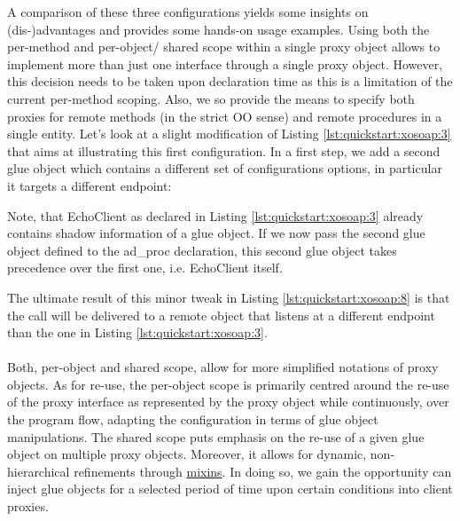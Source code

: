 A comparison of these three configurations yields some insights on (dis-)advantages and provides some  hands-on usage examples. Using both the per-method and per-object/ shared scope within a single proxy object allows to implement more than just one interface through a single proxy object. However, this decision needs to be taken upon declaration time as this is a limitation of the current per-method scoping. Also, we so provide the means to specify both proxies for remote methods (in the strict OO sense) and remote procedures in a single entity. Let's look at a slight modification of Listing \ref{lst:quickstart:xosoap:3} that aims at illustrating this first configuration. In a first step, we add a second glue object which contains a different set of configurations options, in particular it targets a different endpoint:
%

%
Note, that EchoClient as declared in Listing \ref{lst:quickstart:xosoap:3} already contains shadow information of a glue object. If we now pass the second glue object defined to the ad\_proc declaration, this second glue object takes precedence over the first one, i.e. EchoClient itself.
%

%
The ultimate result of this minor tweak in Listing \ref{lst:quickstart:xosoap:8} is that the call will be delivered to a remote object that listens at a different endpoint than the one in Listing \ref{lst:quickstart:xosoap:3}.\\\\
Both, per-object and shared scope, allow for more simplified notations of proxy objects.  As for re-use, the per-object scope is primarily centred around the re-use of the proxy interface as represented by the proxy object while continuously, over the program flow, adapting the configuration in terms of glue object manipulations. The shared scope puts emphasis on the re-use of a given glue object on multiple proxy objects. Moreover, it allows for dynamic, non-hierarchical refinements through \href{http://media.wu-wien.ac.at/doc/tutorial.html#mixins}{mixins}. In doing so, we gain the opportunity can inject glue objects for a selected period of time upon certain conditions into client proxies. 

